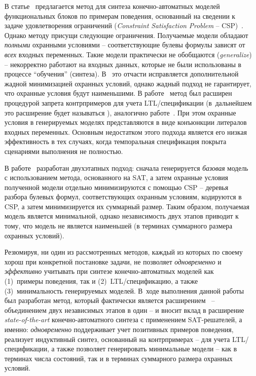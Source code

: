 В статье~\cite{fbCSP} предлагается метод  для синтеза конечно-автоматных моделей функциональных блоков по примерам поведения, основанный на сведении к задаче удовлетворения ограничений (\textit{Constraint Satisfaction Problem} \--- CSP)~\cite{montanari1974}.
Однако методу  присущи следующие ограничения.
Получаемые модели обладают \textit{полными} охранными условиями \--- соответствующие булевы формулы зависят от \textit{всех} входных переменных.
Такие модели практически не обобщаются (\textit{generalize}) \--- некорректно работают на входных данных, которые не были использованы в процессе \enquote{обучения} (синтеза).
В~\cite{fbCSP} это отчасти исправляется дополнительной жадной минимизацией охранных условий, однако жадный подход не гарантирует, что охранные условия будут наименьшими.
В работе~\cite{chivilikhin-18} метод  был расширен процедурой запрета контрпримеров для учета LTL\-/спецификации (в~дальнейшем это расширение будет называться ), аналогично работе~\cite{efsm-tools}.
При этом охранные условия в генерируемых моделях представляются в виде конъюнкции литералов входных переменных.
Основным недостатком этого подхода является его низкая эффективность в тех случаях, когда темпоральная спецификация покрыта сценариями выполнения не полностью.

В работе~\cite{chivilikhin-19} разработан двухэтапных подход:
сначала генерируется \textit{базовая} модель с использованием метода, основанного на SAT, а затем охранные условия полученной модели отдельно минимизируются с помощью CSP \--- деревья разбора булевых формул, соответствующих охранным условиям, кодируются в CSP, а затем минимизируется их суммарный размер.
Таким образом, получаемая модель является минимальной, однако независимость двух этапов приводит к тому, что модель не является наименьшей (в терминах суммарного размера охранных условий).

Резюмируя, ни один из рассмотренных методов, каждый из которых по своему хорош при конкретной постановке задачи, не позволяет \textit{одновременно} и \textit{эффективно} учитывать при синтезе конечно-автоматных моделей как (1)~примеры поведения, так и (2)~LTL\-/спецификацию, а также (3)~минимальность генерируемых моделей.
В~ходе выполнения данной работы был разработан метод, который фактически является расширением~\cite{chivilikhin-19} \--- объединением двух независимых этапов в один \--- и вносит вклад в расширение \textit{state-of-the-art} конечно-автоматного синтеза с применением SAT-решателей, а именно: \textit{одновременно} поддерживает учет позитивных примеров поведения, реализует индуктивный синтез, основанный на контрпримерах \--- для учета LTL\-/спецификации, а также позволяет генерировать минимальные модели \--- как в терминах числа состояний, так и в терминах суммарного размера охранных условий.


